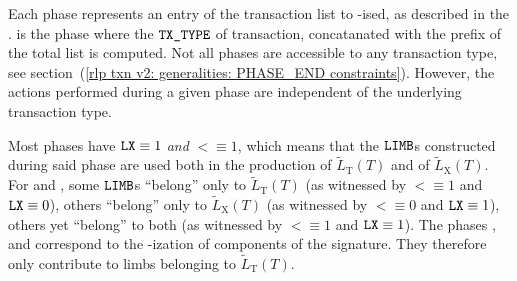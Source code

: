 Each phase represents an entry of the transaction list to \rlp{}-ised, as described in the \cite{EYP-London}.
\phaseRlpPrefix{} is the phase where the $\texttt{TX\_TYPE}$ of transaction,
concatanated with the \rlp{} prefix of the total list is computed.
Not all phases are accessible to any transaction type,
see section~(\ref{rlp txn v2: generalities: PHASE_END constraints}).
However, the actions performed during a given phase are independent of the underlying transaction type.

Most phases have $\texttt{LX} \equiv 1$ \emph{and} $\lt \equiv 1$,
which means that the $\texttt{LIMB}$s constructed during said phase
are used both in the production of
$\widetilde{L}_{\mathrm{T}}(T)$ and of
$\widetilde{L}_{\mathrm{X}}(T)$.
For \phaseRlpPrefix{} and \phaseBeta{},
some $\texttt{LIMB}$s ``belong'' only to $\widetilde{L}_{\mathrm{T}}(T)$ (as witnessed by $\lt \equiv 1$ and $\texttt{LX} \equiv 0$),
others ``belong'' only to $\widetilde{L}_{\mathrm{X}}(T)$ (as witnessed by $\lt \equiv 0$ and $\texttt{LX} \equiv 1$),
others yet ``belong'' to both (as witnessed by $\lt \equiv 1$ and $\texttt{LX} \equiv 1$).
The phases \phaseY{}, \phaseR{} and \phaseS{} correspond to the \rlp{}-ization of components of the signature.
They therefore only contribute to limbs belonging to $\widetilde{L}_{\mathrm{T}}(T)$.

